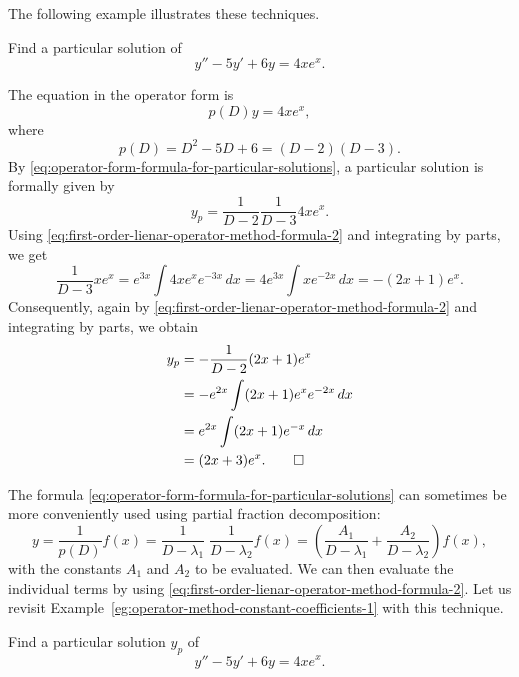 The following example illustrates these techniques.
\begin{example}\label{eg:operator-method-constant-coefficients-1}
	Find a particular solution of 
	\[y''-5y'+6y= 4xe^{x}.\]
	\end{example}
\begin{solution}
	The equation in the operator form is 
\begin{equation*}
	p(D)y =4xe^x,
\end{equation*}where 
\[p(D)= D^2-5D+6=(D-2)(D-3).\] By \eqref{eq:operator-form-formula-for-particular-solutions}, a particular solution is formally given by 
\[y_p = \frac{1}{D-2}\frac{1}{D-3} 4xe^x.\]
 Using \eqref{eq:first-order-lienar-operator-method-formula-2} and integrating by parts, we get
 \[\frac{1}{D-3} xe^x = e^{3x}\int 4xe^x e^{-3x}\, dx = 4e^{3x}\int x e^{-2x}\, dx = -(2x+1)e^x.\]
 Consequently, again by \eqref{eq:first-order-lienar-operator-method-formula-2} and integrating by parts, we obtain
 \[\begin{split}
 	y_p& =-\frac{1}{D-2}(2x+1)e^x \\
 	&= -e^{2x}\int (2x+1)e^x e^{-2x}\, dx \\
 	&=e^{2x}\int (2x+1)e^{-x}\, dx \\
 	&=(2x+3)e^x.\qedhere
 \end{split}\]
\end{solution}
The formula \eqref{eq:operator-form-formula-for-particular-solutions} can sometimes be more conveniently used using partial fraction decomposition:
 \begin{equation}\label{eq:operator-form-formula-for-particular-solutions-partial-fraction-decomposition}
	\boxed{y = \frac{1}{p(D)}f(x) =\frac{1}{D-\lambda_1}\; \frac{1}{D-\lambda_2} f(x) = \left(\frac{A_1}{D-\lambda_1}+ \frac{A_2}{D-\lambda_2}\right)f(x),}
\end{equation}
with the constants $A_1$ and $A_2$ to be evaluated. We can then evaluate the individual terms by using \eqref{eq:first-order-lienar-operator-method-formula-2}. Let us revisit Example~\ref{eg:operator-method-constant-coefficients-1} with this  technique.
\begin{example}\label{eg:operator-method-constant-coefficients-1-revisited}
	Find a particular solution $y_p$ of 
	\[y''-5y'+6y= 4xe^{x}.\]
\end{example}
